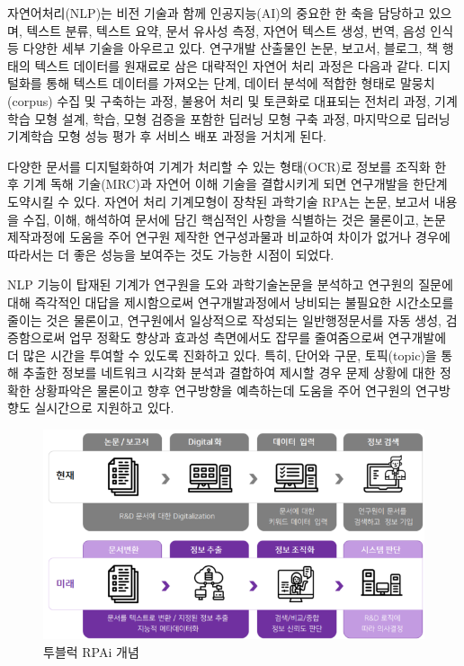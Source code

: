 \documentclass[smallextended]{svjour3}       %
\begin{document}
자연어처리(NLP)는 비전 기술과 함께 인공지능(AI)의 중요한 한 축을
담당하고 있으며, 텍스트 분류, 텍스트 요약, 문서 유사성 측정, 자연어
텍스트 생성, 번역, 음성 인식 등 다양한 세부 기술을 아우르고 있다.
연구개발 산출물인 논문, 보고서, 블로그, 책 행태의 텍스트 데이터를
원재료로 삼은 대략적인 자연어 처리 과정은 다음과 같다. 디지털화를 통해
텍스트 데이터를 가져오는 단계, 데이터 분석에 적합한 형태로
말뭉치(corpus) 수집 및 구축하는 과정, 불용어 처리 및 토큰화로 대표되는
전처리 과정, 기계학습 모형 설계, 학습, 모형 검증을 포함한 딥러닝 모형
구축 과정, 마지막으로 딥러닝 기계학습 모형 성능 평가 후 서비스 배포
과정을 거치게 된다.

다양한 문서를 디지털화하여 기계가 처리할 수 있는 형태(OCR)로 정보를
조직화 한 후 기계 독해 기술(MRC)과 자연어 이해 기술을 결합시키게 되면
연구개발을 한단계 도약시킬 수 있다. 자연어 처리 기계모형이 장착된
과학기술 RPA는 논문, 보고서 내용을 수집, 이해, 해석하여 문서에 담긴
핵심적인 사항을 식별하는 것은 물론이고, 논문 제작과정에 도움을 주어
연구원 제작한 연구성과물과 비교하여 차이가 없거나 경우에 따라서는 더
좋은 성능을 보여주는 것도 가능한 시점이 되었다.

NLP 기능이 탑재된 기계가 연구원을 도와 과학기술논문을 분석하고 연구원의
질문에 대해 즉각적인 대답을 제시함으로써 연구개발과정에서 낭비되는
불필요한 시간소모를 줄이는 것은 물론이고, 연구원에서 일상적으로 작성되는
일반행정문서를 자동 생성, 검증함으로써 업무 정확도 향상과 효과성
측면에서도 잡무를 줄여줌으로써 연구개발에 더 많은 시간을 투여할 수
있도록 진화하고 있다. 특히, 단어와 구문, 토픽(topic)을 통해 추출한
정보를 네트워크 시각화 분석과 결합하여 제시할 경우 문제 상황에 대한
정확한 상황파악은 물론이고 향후 연구방향을 예측하는데 도움을 주어
연구원의 연구방향도 실시간으로 지원하고 있다.

\begin{figure}
\centering
\includegraphics{fig/koita-two-block.png}
\caption{투블럭 RPAi 개념}
\end{figure}




\end{document}
